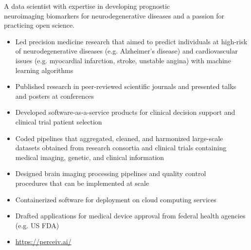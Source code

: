 \documentclass[10pt,a4paper,ragged2e,withhyper]{altacv}
\begin{document}

\makecvheader



\begin{paracol}{2}


A data scientist with expertise in developing prognostic \\neuroimaging biomarkers for neurodegenerative diseases and a passion for practicing open science.
\smallskip



\begin{itemize}
    \item Led precision medicine research that aimed to predict individuals at high-risk of neurodegenerative diseases (e.g. Alzheimer's disease) and cardiovascular issues (e.g. myocardial infarction, stroke, unstable angina) with machine learning algorithms
    \item Published research in peer-reviewed scientific journals and presented talks and posters at conferences
    \item Developed software-as-a-service products for clinical decision support and clinical trial patient selection
    \item Coded pipelines that aggregated, cleaned, and harmonized large-scale datasets obtained from research consortia and clinical trials containing medical imaging, genetic, and clinical information
    \item Designed brain imaging processing pipelines and quality control \\procedures that can be implemented at scale
    \item Containerized software for deployment on cloud computing services
    \item Drafted applications for medical device approval from federal health agencies (e.g. US FDA)
    \item \url{https://perceiv.ai/}
\end{itemize}


\end{paracol}
\end{document}
